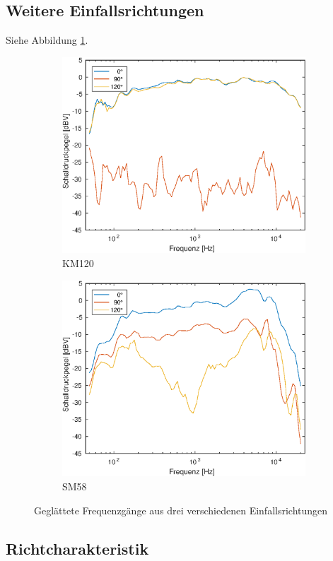 \subsection{Weitere Einfallsrichtungen}
Siehe Abbildung \ref{fig:freq_all}.

\begin{figure}[b]
    \centering
    \begin{subfigure}{.5\textwidth}
        \centering
        \caption{KM120}
        \includegraphics[width=0.95\linewidth]{Figures/km120_all}
    \end{subfigure}%
    \begin{subfigure}{.5\textwidth}
        \centering
        \caption{SM58}
        \includegraphics[width=0.95\linewidth]{Figures/sm58_all.eps}
    \end{subfigure}
    \caption{Geglättete Frequenzgänge aus drei verschiedenen Einfallsrichtungen}
    \label{fig:freq_all}
\end{figure}


\subsection{Richtcharakteristik}
